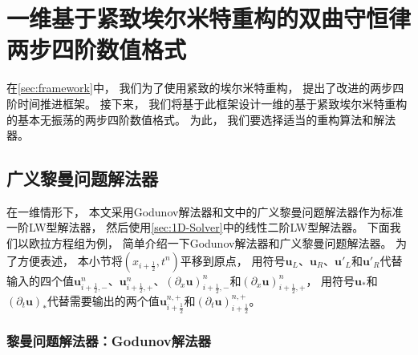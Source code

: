 \chapter{一维基于紧致埃尔米特重构的双曲守恒律两步四阶数值格式}
\label{sec:1D-method}

在\cref{sec:framework}中，
我们为了使用紧致的埃尔米特重构，
提出了改进的两步四阶时间推进框架。
接下来，
我们将基于此框架设计一维的基于紧致埃尔米特重构的基本无振荡的两步四阶数值格式。
为此，
我们要选择适当的重构算法和解法器。

\section{广义黎曼问题解法器}
\label{sec:1D-solver-sec3}

在一维情形下，
本文采用Godunov解法器和文\cite{GRP}中的广义黎曼问题解法器作为标准一阶LW型解法器，
然后使用\cref{sec:1D-Solver}中的线性二阶LW型解法器。
下面我们以欧拉方程组为例，
简单介绍一下Godunov解法器和广义黎曼问题解法器。
为了方便表述，
本小节将$(x_{i+\frac{1}{2}},t^n)$平移到原点，
用符号$\bm u_L$、$\bm u_R$、$\bm u'_L$和$\bm u'_R$代替输入的四个值${\bm{u}}_{i+\frac{1}{2},-}^n$、${\bm{u}}_{i+\frac{1}{2},+}^n$、$\left({\partial_{x}}{\bm{u}}\right)_{i+\frac{1}{2},-}^n$和$\left({\partial_{x}}{\bm{u}}\right)_{i+\frac{1}{2},+}^n$，
用符号$\bm u_*$和$\left({\partial_t}\bm u\right)_*$代替需要输出的两个值${\bm u}_{i+\frac{1}{2}}^{n,+}$和$\left({\partial_{t}}{\bm{u}}\right)_{i+\frac{1}{2}}^{n,+}$。

\subsection{黎曼问题解法器：Godunov解法器}

